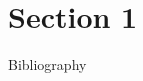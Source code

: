 \documentclass{article}
\begin{document}
\section{Section 1}
Bibliography \cite{Ref1}
\printbibliography
\end{document}

